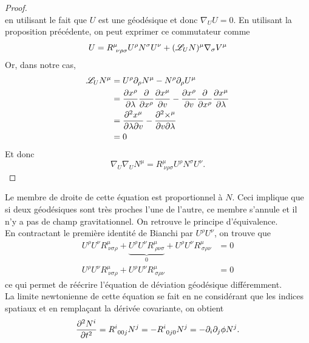 \documentclass[a4paper,11pt]{report}
\begin{document}
\begin{proof}
\begin{equation}
                \end{equation}
                en utilisant le fait que $U$ est une géodésique et donc $\nabla_U U = 0$. En utilisant la proposition précédente, on peut exprimer ce commutateur comme
                \begin{equation}
                    [\nabla_U,\nabla_N]U = R^\mu_{~\nu\rho\sigma}U^\rho N^\sigma U^\nu + (\L_U N)^\mu \nabla_\sigma V^\mu
                \end{equation}
                Or, dans notre cas,
                \begin{align}
                    \mathscr{L}_U N^\mu &= U^\rho\partial_\rho N^\mu-N^\rho\partial_\rho U^\mu\\
                    &= \pdv{x^\rho}{\lambda}\pdv{}{x^\rho}\pdv{x^\mu}{v}-\pdv{x^\rho}{v}\pdv{}{x^\rho}\pdv{x^\mu}{\lambda}\\
                    &= \pdv{x^\mu}{\lambda}{v}-\pdv{\times^\mu}{v}{\lambda}\\
                    &= 0
                \end{align}
                Et donc
                \begin{equation}
                    \nabla_U\nabla_U N^\mu = R^\mu_{~\nu\rho\sigma}U^\rho N^\sigma U^\nu.
                \end{equation}
            \end{proof}
            Le membre de droite de cette équation est proportionnel à $N$. Ceci implique que si deux géodésiques sont très proches l'une de l'autre, ce membre s'annule et il n'y a pas de champ gravitationnel. On retrouve le principe d'équivalence.\\
        
            En contractant le première identité de Bianchi par $U^\rho U^\nu$, on trouve que 
            \begin{align}
                U^\rho U^\nu R^\mu_{~\nu\sigma\rho}+\underbrace{U^\rho U^\nu R^\mu_{~\rho\nu\sigma}}_{0}+U^\rho U^\nu R^\mu_{~\sigma\rho\nu} &= 0\\
                U^\rho U^\nu R^\mu_{~\nu\sigma\rho}+U^\rho U^\nu R^\mu_{~\sigma\rho\nu} &= 0
            \end{align}
            ce qui permet de réécrire l'équation de déviation géodésique différemment.\\
            
            La limite newtonienne de cette équation se fait en ne considérant que les indices spatiaux et en remplaçant la dérivée covariante, on obtient
            \begin{equation}
                \pdv[2]{N^i}{t} = R^i_{~00j}N^j = -R^i_{~0j0}N^j = -\partial_i\partial_j\phi N^j.
            \end{equation}
        
\end{document}
